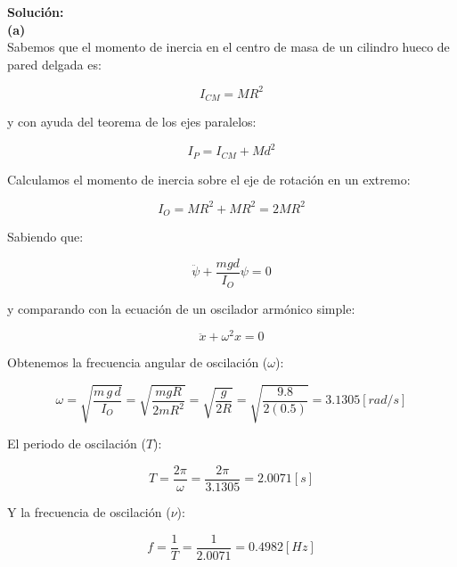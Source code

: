 \documentclass[letter,11pt]{article}
\begin{document}
\vspace{0.5cm}
\textbf{Solución:} \\

\textbf{(a)} \\

Sabemos que el momento de inercia en el centro de masa de un cilindro hueco de
pared delgada es:

\begin{equation*}
    I_{CM} = M R^2
\end{equation*}

y con ayuda del teorema de los ejes paralelos:

\begin{equation*}
    I_{P} = I_{CM} + M d^2
\end{equation*}

Calculamos el momento de inercia sobre el eje de rotación en un extremo:

\begin{equation}
    I_{O} = M R^2 + M R^2 = 2 M R^2
\end{equation}

Sabiendo que:

\begin{equation*}
    \ddot{\psi} + \frac{m g d}{I_O} \psi = 0
\end{equation*}

y comparando con la ecuación de un oscilador armónico simple:

\begin{equation*}
    \ddot{x} + \omega^2 x = 0
\end{equation*}

Obtenemos la frecuencia angular de oscilación ($\omega$):

\begin{equation}
    \omega = \sqrt{ \frac{m\, g\, d}{I_O} } = \sqrt{ \frac{m g R}{2 m R^2} } = \sqrt{ \frac{g}{2 R} } = \sqrt{ \frac{9.8}{2(0.5)} } = 3.1305 [rad/s]
\end{equation}

El periodo de oscilación ($T$):

\begin{equation}
    T = \frac{2 \pi}{\omega} = \frac{2 \pi}{3.1305} = 2.0071 [s]
\end{equation}

Y la frecuencia de oscilación ($\nu$):

\begin{equation}
    f = \frac{1}{T} = \frac{1}{2.0071} = 0.4982 [Hz]
\end{equation}
\end{document}
